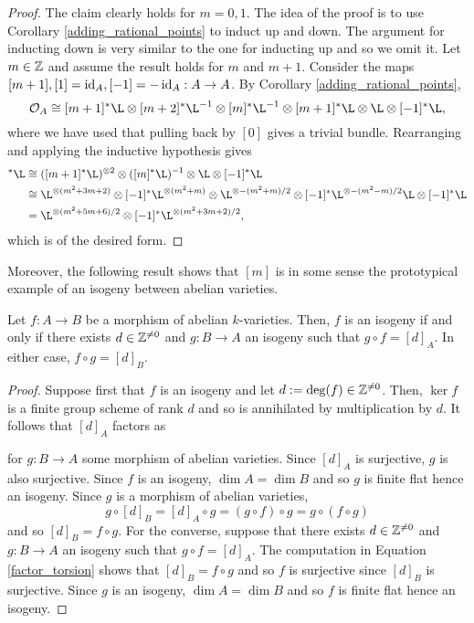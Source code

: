 \documentclass[11pt]{article}
\begin{document}
\begin{proof}
The claim clearly holds for $m=0,1$. The idea of the proof is to use Corollary \ref{adding_rational_points} to induct up and down. The argument for inducting down is very similar to the one for inducting up and so we omit it. Let $m\in\mathbb{Z}$ and assume the result holds for $m$ and $m+1$. Consider the maps $[m+1],[1]=\operatorname{id}_A,[-1]=-\operatorname{id}_A: A\to A$. By Corollary \ref{adding_rational_points},
\begin{equation*}
\O_A\iso[m+1]^*\L\tensor[m+2]^*\L^{-1}\tensor[m]^*\L^{-1}\tensor[m+1]^*\L\tensor\L\tensor[-1]^*\L,
\end{equation*}
where we have used that pulling back by $[0]$ gives a trivial bundle. Rearranging and applying the inductive hypothesis gives
\begin{align*}
[m+2]^*\L
&\iso([m+1]^*\L)^{\tensor2}\tensor([m]^*\L)^{-1}\tensor\L\tensor[-1]^*\L \\
&\iso\L^{\tensor(m^2+3m+2)}\tensor[-1]^*\L^{\tensor(m^2+m)}\tensor\L^{\tensor-(m^2+m)/2}\tensor[-1]^*\L^{\tensor-(m^2-m)/2}\L\tensor[-1]^*\L \\
&=\L^{\tensor(m^2+5m+6)/2}\tensor[-1]^*\L^{\tensor(m^2+3m+2)/2},
\end{align*}
which is of the desired form.
\end{proof}

Moreover, the following result shows that $[m]$ is in some sense the prototypical example of an isogeny between abelian varieties.

\begin{theorem}
Let $f: A\to B$ be a morphism of abelian $k$-varieties. Then, $f$ is an isogeny if and only if there exists $d\in\mathbb{Z}^{\neq0}$ and $g: B\to A$ an isogeny such that $g\circ f=[d]_A$. In either case, $f\circ g=[d]_B$.
\end{theorem}

\begin{proof}
Suppose first that $f$ is an isogeny and let $d:=\deg(f)\in\mathbb{Z}^{\neq0}$. Then, $\ker f$ is a finite group scheme of rank $d$ and so is annihilated by multiplication by $d$. It follows that $[d]_A$ factors as 
\begin{center}
\end{center}
for $g: B\to A$ some morphism of abelian varieties. Since $[d]_A$ is surjective, $g$ is also surjective. Since $f$ is an isogeny, $\dim A=\dim B$ and so $g$ is finite flat hence an isogeny. Since $g$ is a morphism of abelian varieties,
\begin{equation}\label{factor_torsion}
g\circ[d]_B=[d]_A\circ g=(g\circ f)\circ g=g\circ(f\circ g)
\end{equation}
and so $[d]_B=f\circ g$. For the converse, suppose that there exists $d\in\mathbb{Z}^{\neq0}$ and $g: B\to A$ an isogeny such that $g\circ f=[d]_A$. The computation in Equation \eqref{factor_torsion} shows that $[d]_B=f\circ g$ and so $f$ is surjective since $[d]_B$ is surjective. Since $g$ is an isogeny, $\dim A=\dim B$ and so $f$ is finite flat hence an isogeny.
\end{proof}
\end{document}
